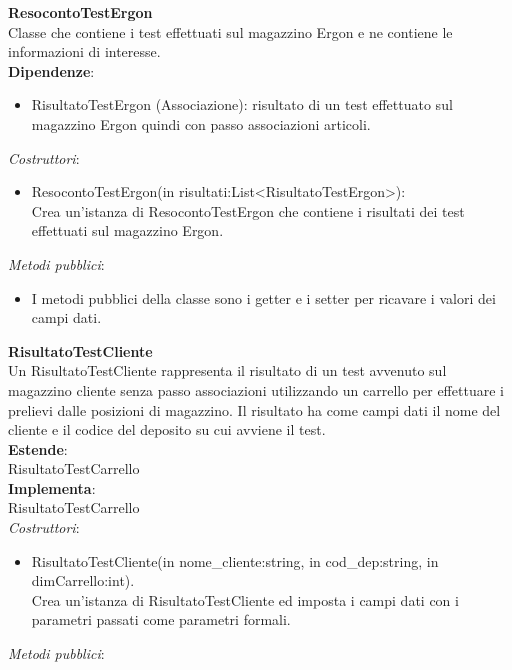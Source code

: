 \textbf{ResocontoTestErgon}\\
Classe che contiene i test effettuati sul magazzino Ergon e ne contiene le informazioni di interesse.\\
\textbf{Dipendenze}:
\begin{itemize}
    \item RisultatoTestErgon (Associazione): risultato di un test effettuato sul magazzino Ergon quindi con passo associazioni articoli.\\
\end{itemize}
\textit{Costruttori}:\\
\begin{itemize}
    \item ResocontoTestErgon(in risultati:List<RisultatoTestErgon>):\\
    Crea un'istanza di ResocontoTestErgon che contiene i risultati dei test effettuati sul magazzino Ergon.
\end{itemize}
\textit{Metodi pubblici}:\\
\begin{itemize}
    \item I metodi pubblici della classe sono i getter e i setter per ricavare i valori dei campi dati.\\
\end{itemize} 
\textbf{RisultatoTestCliente}\\
Un RisultatoTestCliente rappresenta il risultato di un test avvenuto sul magazzino cliente senza passo associazioni utilizzando un carrello  per effettuare i prelievi 
dalle posizioni di magazzino.
Il risultato ha come campi dati il nome del cliente e il codice del deposito su cui avviene il test.\\
\textbf{Estende}:\\
RisultatoTestCarrello\\
\textbf{Implementa}:\\
RisultatoTestCarrello\\
\textit{Costruttori}:\\
\begin{itemize}
    \item RisultatoTestCliente(in nome\_cliente:string, in cod\_dep:string, in dimCarrello:int).\\
    Crea un'istanza di RisultatoTestCliente ed imposta i campi dati con i parametri passati come parametri formali.\\
\end{itemize}
\textit{Metodi pubblici}:\\
